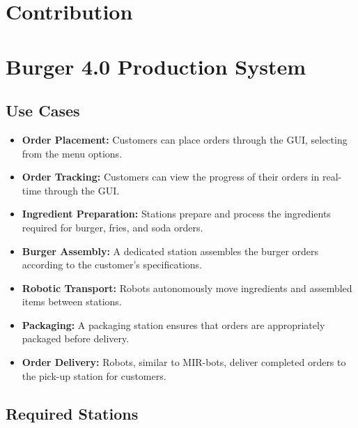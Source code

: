 \documentclass[conference]{IEEEtran}
\begin{document}
\maketitle
\IEEEpubidadjcol


\section{Contribution}

\section{Burger 4.0 Production System}

\subsection{Use Cases}

\begin{itemize}
    \item \textbf{Order Placement:} Customers can place orders through the GUI, selecting from the menu options.
    
    \item \textbf{Order Tracking:} Customers can view the progress of their orders in real-time through the GUI.
    
    \item \textbf{Ingredient Preparation:} Stations prepare and process the ingredients required for burger, fries, and soda orders.
    
    \item \textbf{Burger Assembly:} A dedicated station assembles the burger orders according to the customer's specifications.
    
    \item \textbf{Robotic Transport:} Robots autonomously move ingredients and assembled items between stations.
    
    \item \textbf{Packaging:} A packaging station ensures that orders are appropriately packaged before delivery.
    
    \item \textbf{Order Delivery:} Robots, similar to MIR-bots, deliver completed orders to the pick-up station for customers.
\end{itemize}

\subsection{Required Stations}
\end{document}
